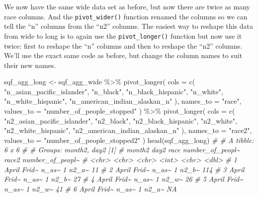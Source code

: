 \documentclass[
  a4paper,
]{krantz}
\makeatletter
\newenvironment{Shaded}{\begin{snugshade}}{\end{snugshade}}
\newcommand{\AttributeTok}[1]{\textcolor[rgb]{0.61,0.61,0.61}{#1}}
\newcommand{\CommentTok}[1]{\textcolor[rgb]{0.37,0.37,0.37}{\textit{#1}}}
\newcommand{\FunctionTok}[1]{\textcolor[rgb]{0,0,0}{#1}}
\newcommand{\NormalTok}[1]{#1}
\newcommand{\OtherTok}[1]{\textcolor[rgb]{0.37,0.37,0.37}{#1}}
\newcommand{\SpecialCharTok}[1]{\textcolor[rgb]{0,0,0}{#1}}
\newcommand{\StringTok}[1]{\textcolor[rgb]{0.5,0.5,0.5}{#1}}
\newenvironment{kframe}{%
\medskip{}
\setlength{\fboxsep}{.8em}
 \def\at@end@of@kframe{}%
 \ifinner\ifhmode%
  \def\at@end@of@kframe{\end{minipage}}%
  \begin{minipage}{\columnwidth}%
 \fi\fi%
 \def\FrameCommand##1{\hskip\@totalleftmargin \hskip-\fboxsep
 \colorbox{shadecolor}{##1}\hskip-\fboxsep
     \hskip-\linewidth \hskip-\@totalleftmargin \hskip\columnwidth}%
 \MakeFramed {\advance\hsize-\width
   \@totalleftmargin\z@ \linewidth\hsize
   \@setminipage}}%
 {\par\unskip\endMakeFramed%
 \at@end@of@kframe}
\renewenvironment{Shaded}{\begin{kframe}}{\end{kframe}}
\makeatother
\begin{document}
We now have the same wide data set as before, but now there
are twice as many race columns. And the
\texttt{pivot\_wider()} function renamed the columns so we
can tell the ``n'' columns from the ``n2'' columns. The
easiest way to reshape this data from wide to long is to
again use the \texttt{pivot\_longer()} function but now use
it twice: first to reshape the ``n'' columns and then to
reshape the ``n2'' columns. We'll use the exact same code as
before, but change the column names to suit their new names.

\begin{Shaded}
\begin{Highlighting}[]
\NormalTok{sqf\_agg\_long }\OtherTok{\textless{}{-}}\NormalTok{ sqf\_agg\_wide }\SpecialCharTok{\%\textgreater{}\%}
  \FunctionTok{pivot\_longer}\NormalTok{(}
    \AttributeTok{cols =} \FunctionTok{c}\NormalTok{(}
      \StringTok{"n\_asian\_pacific\_islander"}\NormalTok{,}
      \StringTok{"n\_black"}\NormalTok{,}
      \StringTok{"n\_black\_hispanic"}\NormalTok{,}
      \StringTok{"n\_white"}\NormalTok{,}
      \StringTok{"n\_white\_hispanic"}\NormalTok{,}
      \StringTok{"n\_american\_indian\_alaskan\_n"}
\NormalTok{    ),}
    \AttributeTok{names\_to =} \StringTok{"race"}\NormalTok{,}
    \AttributeTok{values\_to =} \StringTok{"number\_of\_people\_stopped"}
\NormalTok{  ) }\SpecialCharTok{\%\textgreater{}\%}
  \FunctionTok{pivot\_longer}\NormalTok{(}
    \AttributeTok{cols =} \FunctionTok{c}\NormalTok{(}
      \StringTok{"n2\_asian\_pacific\_islander"}\NormalTok{,}
      \StringTok{"n2\_black"}\NormalTok{,}
      \StringTok{"n2\_black\_hispanic"}\NormalTok{,}
      \StringTok{"n2\_white"}\NormalTok{,}
      \StringTok{"n2\_white\_hispanic"}\NormalTok{,}
      \StringTok{"n2\_american\_indian\_alaskan\_n"}
\NormalTok{    ),}
    \AttributeTok{names\_to =} \StringTok{"race2"}\NormalTok{,}
    \AttributeTok{values\_to =} \StringTok{"number\_of\_people\_stopped2"}
\NormalTok{  )}
\FunctionTok{head}\NormalTok{(sqf\_agg\_long)}
\CommentTok{\# \# A tibble: 6 x 6}
\CommentTok{\# \# Groups:   month2, day2 [1]}
\CommentTok{\#   month2 day2  race  number\_of\_peopl\textasciitilde{} race2 number\_of\_peopl\textasciitilde{}}
\CommentTok{\#   \textless{}chr\textgreater{}  \textless{}chr\textgreater{} \textless{}chr\textgreater{}            \textless{}int\textgreater{} \textless{}chr\textgreater{}            \textless{}dbl\textgreater{}}
\CommentTok{\# 1 April  Frid\textasciitilde{} n\_as\textasciitilde{}                1 n2\_a\textasciitilde{}               11}
\CommentTok{\# 2 April  Frid\textasciitilde{} n\_as\textasciitilde{}                1 n2\_b\textasciitilde{}              114}
\CommentTok{\# 3 April  Frid\textasciitilde{} n\_as\textasciitilde{}                1 n2\_b\textasciitilde{}               27}
\CommentTok{\# 4 April  Frid\textasciitilde{} n\_as\textasciitilde{}                1 n2\_w\textasciitilde{}               26}
\CommentTok{\# 5 April  Frid\textasciitilde{} n\_as\textasciitilde{}                1 n2\_w\textasciitilde{}               41}
\CommentTok{\# 6 April  Frid\textasciitilde{} n\_as\textasciitilde{}                1 n2\_a\textasciitilde{}               NA}
\end{Highlighting}
\end{Shaded}
\end{document}

